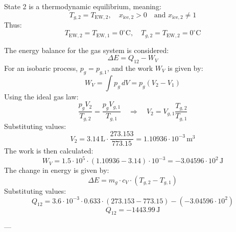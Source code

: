 State 2 is a thermodynamic equilibrium, meaning:  
\[
T_{g,2} = T_{\text{EW},2}, \quad x_{\text{ice},2} > 0 \quad \text{and } x_{\text{ice},2} \neq 1
\]  
Thus:  
\[
T_{\text{EW},2} = T_{\text{EW},1} = 0^\circ\text{C}, \quad T_{g,2} = T_{\text{EW},2} = 0^\circ\text{C}
\]

The energy balance for the gas system is considered:  
\[
\Delta E = Q_{12} - W_V
\]  
For an isobaric process, \( p_g = p_{g,1} \), and the work \( W_V \) is given by:  
\[
W_V = \int p_g \, dV = p_g (V_2 - V_1)
\]  
Using the ideal gas law:  
\[
\frac{p_g V_2}{T_{g,2}} = \frac{p_g V_{g,1}}{T_{g,1}} \quad \Rightarrow \quad V_2 = V_{g,1} \frac{T_{g,2}}{T_{g,1}}
\]  
Substituting values:  
\[
V_2 = 3.14 \, \text{L} \cdot \frac{273.153}{773.15} = 1.10936 \cdot 10^{-3} \, \text{m}^3
\]  
The work is then calculated:  
\[
W_V = 1.5 \cdot 10^5 \cdot (1.10936 - 3.14) \cdot 10^{-3} = -3.04596 \cdot 10^2 \, \text{J}
\]  
The change in energy is given by:  
\[
\Delta E = m_g \cdot c_V \cdot (T_{g,2} - T_{g,1})
\]  
Substituting values:  
\[
Q_{12} = 3.6 \cdot 10^{-3} \cdot 0.633 \cdot (273.153 - 773.15) - (-3.04596 \cdot 10^2)
\]  
\[
Q_{12} = -1443.99 \, \text{J}
\]  

---